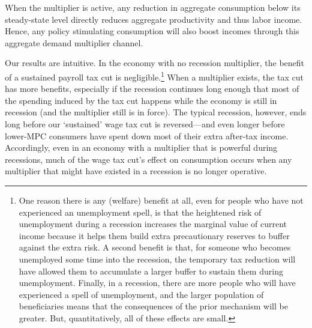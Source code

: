 \documentclass[\econtexRoot/HAFiscal]{subfiles}
\begin{document}
When the multiplier is active, any reduction in aggregate consumption below its steady-state level directly reduces aggregate productivity and thus labor income. Hence, any policy stimulating consumption will also boost incomes through this aggregate demand multiplier channel.


Our results are intuitive.  In the economy with no recession multiplier, the benefit of a sustained payroll tax cut is negligible.\footnote{One reason there is any (welfare) benefit at all, even for people who have not experienced an unemployment spell, is that the heightened risk of unemployment during a recession increases the marginal value of current income because it helps them build extra precautionary reserves to buffer against the extra risk.  A second benefit is that, for someone who becomes unemployed some time into the recession, the temporary tax reduction will have allowed them to accumulate a larger buffer to sustain them during unemployment.  Finally, in a recession, there are more people who will have experienced a spell of unemployment, and the larger population of beneficiaries means that the consequences of the prior mechanism will be greater.  But, quantitatively, all of these effects are small.}
When a multiplier exists, the tax cut has more benefits, especially if the recession continues long enough that most of the spending induced by the tax cut happens while the economy is still in recession (and the multiplier still is in force).  The typical recession, however, ends long before our `sustained' wage tax cut is reversed---and even longer before lower-MPC consumers have spent down most of their extra after-tax income. Accordingly, even in an economy with a multiplier that is powerful during recessions, much of the wage tax cut's effect on consumption occurs when any multiplier that might have existed in a recession is no longer operative.
\end{document}
